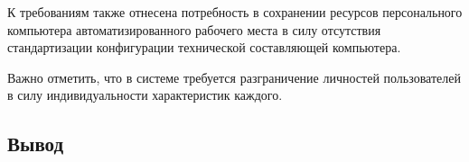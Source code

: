 К требованиям также отнесена потребность в сохранении ресурсов персонального компьютера автоматизированного рабочего места в силу отсутствия стандартизации конфигурации технической составляющей компьютера.

Важно отметить, что в системе требуется разграничение личностей пользователей в силу индивидуальности характеристик каждого.

\subsection*{Вывод}






